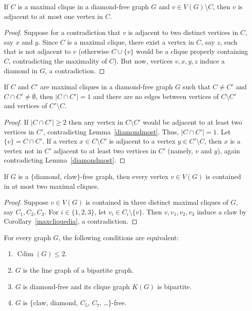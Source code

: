 \documentclass[12pt,a4paper,titlepage,openany]{report}
\DeclareMathOperator{\Cdim}{Cdim}
\begin{document}
\begin{lemma}\label{diamondmost}
If $C$ is a maximal clique in a diamond-free graph $G$ and $v\in V(G)\setminus  C$, then $v$ is adjacent to at most one vertex in $C$.
\end{lemma}

\begin{proof}
Suppose for a contradiction that $v$ is adjacent to two distinct vertices in $C$, say $x$ and $y$. Since $C$ is a maximal clique, there exist a vertex in $C$, say $z$, such that is not adjacent to $v$ (otherwise $C\cup \{v\}$ would be a clique properly containing $C$, contradicting the maximality of $C$). But now, vertices $v,x,y,z$ induce a diamond in $G$, a contradiction.
\end{proof}


\begin{corollary}\label{maxcliquedia}
If $C$ and $C'$ are maximal cliques in a diamond-free graph $G$ such that $C\neq C'$ and $C\cap C'\neq \emptyset$, then $|C\cap C'|= 1$ and there are no edges between vertices of $C\setminus  C'$ and vertices of $C'\setminus  C$.
\end{corollary}

\begin{proof}
If $|C\cap C'|\geq 2$ then any vertex in $C\setminus  C'$ would be adjacent to at least two vertices in $C'$, contradicting Lemma~\ref{diamondmost}. Thus, $|C\cap C'|=1$. Let $\{v\}= C\cap C'$. If a vertex $x\in C\setminus  C'$ is adjacent to a vertex $y\in C'\setminus  C$, then $x$ is a vertex not in $C'$ adjacent to at least two vertices in $C'$ (namely, $v$ and $y$), again contradicting Lemma~\ref{diamondmost}.
\end{proof}

\begin{corollary}\label{diamondclaw}
If $G$ is a $\{$diamond, claw$\}$-free graph, then every vertex $v\in V(G)$ is contained in at most two maximal cliques.
\end{corollary}

\begin{proof}
Suppose $v\in V(G)$ is contained in three distinct maximal cliques of $G$, say $C_1,C_2,C_3$. For $i\in \{1,2,3\}$, let $v_i\in C_i\setminus\{v\}$. Then $v,v_1,v_2,v_3$ induce a claw by Corollary~\ref{maxcliquedia}, a contradiction.
\end{proof}

\begin{theorem}
For every graph $G$, the following conditions are equivalent:
\begin{enumerate}
\item $\Cdim(G)\leq 2$.
\item $G$ is the line graph of a bipartite graph.
\item $G$ is diamond-free and its clique graph $K(G)$ is bipartite.
\item $G$ is \{claw, diamond, $C_5$, $C_7$, \ldots\}-free.
\end{enumerate}
\end{theorem}
\end{document}
